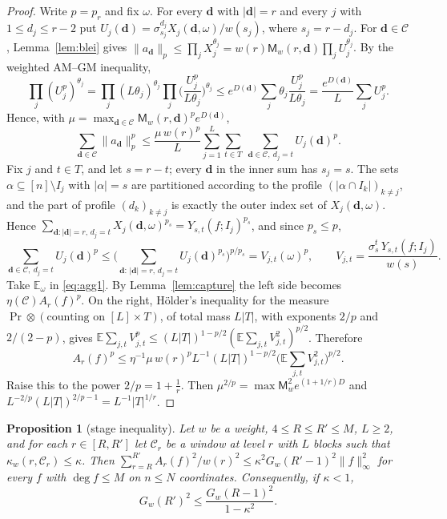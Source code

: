 \documentclass[11pt]{amsart}
\newtheorem{proposition}[theorem]{Proposition}
\theoremstyle{definition}
\newcommand{\E}{\mathbb{E}}
\newcommand{\bd}{\mathbf d}
\begin{document}
\begin{proof}
Write $p=p_r$ and fix $\omega$. For every $\bd$ with $|\bd|=r$ and every $j$ with $1\le d_j\le r-2$ put $U_j(\bd)=\sigma_{s_j}^{d_j}X_j(\bd,\omega)/w(s_j)$, where $s_j=r-d_j$. For $\bd\in\mathcal C$, Lemma~\ref{lem:blei} gives $\|a_\bd\|_p\le\prod_jX_j^{\theta_j}=w(r)\mathsf M_w(r,\bd)\prod_jU_j^{\theta_j}$. By the weighted AM--GM inequality,
\[
\prod_j(U_j^p)^{\theta_j}=\prod_j(L\theta_j)^{\theta_j}\prod_j\Big(\frac{U_j^p}{L\theta_j}\Big)^{\theta_j}\le e^{D(\bd)}\sum_j\theta_j\frac{U_j^p}{L\theta_j}=\frac{e^{D(\bd)}}L\sum_jU_j^p .
\]
Hence, with $\mu=\max_{\bd\in\mathcal C}\mathsf M_w(r,\bd)^pe^{D(\bd)}$,
\begin{equation}\label{eq:agg1}
\sum_{\bd\in\mathcal C}\|a_\bd\|_p^p\le\frac{\mu\,w(r)^p}L\sum_{j=1}^L\sum_{t\in T}\ \sum_{\bd\in\mathcal C,\ d_j=t}U_j(\bd)^p .
\end{equation}
Fix $j$ and $t\in T$, and let $s=r-t$; every $\bd$ in the inner sum has $s_j=s$. The sets $\alpha\subseteq[n]\setminus I_j$ with $|\alpha|=s$ are partitioned according to the profile $(|\alpha\cap I_k|)_{k\ne j}$, and the part of profile $(d_k)_{k\ne j}$ is exactly the outer index set of $X_j(\bd,\omega)$. Hence $\sum_{\bd:|\bd|=r,\,d_j=t}X_j(\bd,\omega)^{p_s}=Y_{s,t}(f;I_j)^{p_s}$, and since $p_s\le p$,
\[
\sum_{\bd\in\mathcal C,\ d_j=t}U_j(\bd)^p\le\Big(\sum_{\bd:\,|\bd|=r,\,d_j=t}U_j(\bd)^{p_s}\Big)^{p/p_s}=V_{j,t}(\omega)^p,\qquad V_{j,t}=\frac{\sigma_s^{t}\,Y_{s,t}(f;I_j)}{w(s)} .
\]
Take $\E_\omega$ in \eqref{eq:agg1}. By Lemma~\ref{lem:capture} the left side becomes $\eta(\mathcal C)A_r(f)^p$. On the right, H\"older's inequality for the measure $\Pr\otimes(\text{counting on }[L]\times T)$, of total mass $L|T|$, with exponents $2/p$ and $2/(2-p)$, gives
$\E\sum_{j,t}V_{j,t}^p\le(L|T|)^{1-p/2}(\E\sum_{j,t}V_{j,t}^2)^{p/2}$. Therefore
\[
A_r(f)^p\le\eta^{-1}\mu\,w(r)^pL^{-1}(L|T|)^{1-p/2}\Big(\E\sum_{j,t}V_{j,t}^2\Big)^{p/2}.
\]
Raise this to the power $2/p=1+\frac1r$. Then $\mu^{2/p}=\max\mathsf M_w^2e^{(1+1/r)D}$ and $L^{-2/p}(L|T|)^{2/p-1}=L^{-1}|T|^{1/r}$.
\end{proof}

\begin{proposition}[stage inequality]\label{prop:stage}
Let $w$ be a weight, $4\le R\le R'\le M$, $L\ge2$, and for each $r\in[R,R']$ let $\mathcal C_r$ be a window at level $r$ with $L$ blocks such that $\kappa_w(r,\mathcal C_r)\le\kappa$. Then $\sum_{r=R}^{R'}A_r(f)^2/w(r)^2\le\kappa^2G_w(R'-1)^2\|f\|_\infty^2$ for every $f$ with $\deg f\le M$ on $n\le N$ coordinates. Consequently, if $\kappa<1$,
\[
G_w(R')^2\le\frac{G_w(R-1)^2}{1-\kappa^2}.
\]
\end{proposition}
\end{document}
